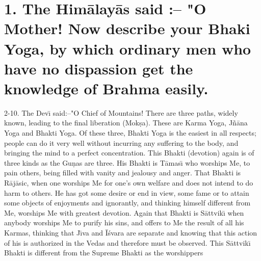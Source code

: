 \chapter{1. The Him\=alay\=as said :-- "O Mother! Now describe your Bhaki Yoga, by which ordinary men who have no dispassion get the knowledge of Brahma easily.}
2-10. The Dev\={\i} said:--"O Chief of Mountains! There are three paths, widely known, leading to the final liberation (Mok\d{s}a). These are Karma Yoga, J\~n\=ana Yoga and Bhakti Yoga. Of these three, Bhakti Yoga is the easiest in all respects; people can do it very well without incurring any suffering to the body, and bringing the mind to a perfect concentration. This Bhakti (devotion) again is of three kinds as the Gu\d{n}as are three. His Bhakti is T\=amas\={\i} who worships Me, to pain others, being filled with vanity and jealousy and anger. That Bhakti is R\=aj\=asic, when one worships Me for one's own welfare and does not intend to do harm to others. He has got some desire or end in view, some fame or to attain some objects of enjoyments and ignorantly, and thinking himself different from Me, worships Me with greatest devotion. Again that Bhakti is S\=attvik\={\i} when anybody worships Me to purify his sins, and offers to Me the result of all his Karmas, thinking that J\={\i}va and \=I\'svara are separate and knowing that this action of his is authorized in the Vedas and therefore must be observed. This S\=attvik\={\i} Bhakti is different from the Supreme Bhakti as the worshippers

